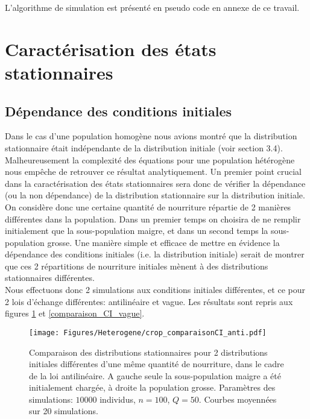 L'algorithme de simulation est présenté en pseudo code en annexe de ce travail. \\


\section{Caractérisation des états stationnaires}

\subsection{Dépendance des conditions initiales}
Dans le cas d'une population homogène nous avions montré que la distribution stationnaire était indépendante de la distribution initiale (voir section 3.4). Malheureusement la complexité des équations pour une population hétérogène nous empêche de retrouver ce résultat analytiquement. Un premier point crucial dans la caractérisation des états stationnaires sera donc de vérifier la dépendance (ou la non dépendance) de la distribution stationnaire sur la distribution initiale.\\

On considère donc une certaine quantité de nourriture répartie de 2 manières différentes dans la population. Dans un premier temps on choisira de ne remplir initialement que la sous-population maigre, et dans un second temps la sous-population grosse. Une manière simple et efficace de mettre en évidence la dépendance des conditions initiales (i.e. la distribution initiale) serait de montrer que ces 2 répartitions de nourriture initiales mènent à des distributions stationnaires différentes. \\

Nous effectuons donc 2 simulations aux conditions initiales différentes, et ce pour 2 lois d'échange différentes: antilinéaire et vague. Les résultats sont repris aux figures \ref{comparaison_CI_anti} et \ref{comparaison_CI_vague}.\\

\begin{figure}[h!]
\centering
\texttt{[image: Figures/Heterogene/crop\_comparaisonCI\_anti.pdf]}
\caption{Comparaison des distributions stationnaires pour 2 distributions initiales différentes d'une même quantité de nourriture, dans le cadre de la loi antilinéaire. A gauche seule la sous-population maigre a été initialement chargée, à droite la population grosse. Paramètres des simulations: $10000$ individus, $n=100$, $Q = 50$. Courbes moyennées sur 20 simulations.}
\label{comparaison_CI_anti}
\end{figure}

